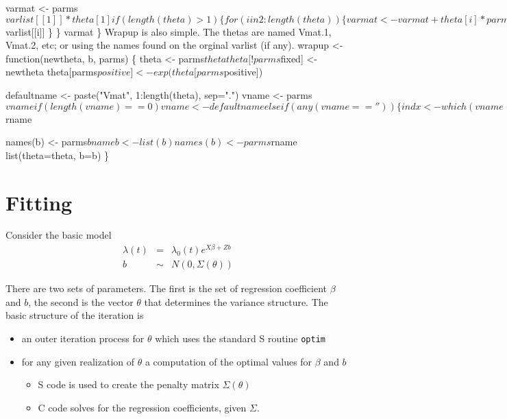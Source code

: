 \documentclass{article}
\begin{document}
     varmat <- parms$varlist[[1]] * theta[1]
     if (length(theta) >1) \{
         for (i in 2:length(theta)) \{
             varmat <- varmat + theta[i]*parms$varlist[[i]]
             \}
         \}
     varmat
     \}
\nwendcode{}\nwdocspar
Wrapup is also simple. The thetas are named Vmat.1, Vmat.2, etc; or using
the names found on the orginal varlist (if any).
\nwenddocs{}\endmoddef
wrapup <- function(newtheta, b, parms) \{
        theta <- parms$theta
        theta[!parms$fixed] <- newtheta
        theta[parms$positive] <- exp(theta[parms$positive])

        defaultname <- paste("Vmat", 1:length(theta), sep=".")
        vname <- parms$vname
        if (length(vname)==0) vname <- defaultname
        else if (any(vname==''))\{
            indx <- which(vname=='')
            vname[indx] <- defaultname[indx]
            \}
        names(theta) <- vname
        theta <- list(theta)
        names(theta) <- parms$rname
        
        names(b) <- parms$bname
        b <- list(b)
        names(b) <- parms$rname
        list(theta=theta, b=b)
        \}
\nwendcode{}\nwdocspar
\section{Fitting}
Consider the basic model
\begin{eqnarray*}
 \lambda(t) &=& \lambda_0(t) e^{X\beta + Zb} \\
 b &\sim& N(0, \Sigma(\theta))
\end{eqnarray*}

There are two sets of parameters.
The first is the set of regression coefficient $\beta$ and $b$,
the second is the vector $\theta$ that determines the variance
structure.
The basic structure of the iteration is
\begin{itemize}
\item an outer iteration process for $\theta$ which uses the standard
S routine {\tt{}optim}
\item for any given realization of $\theta$ a computation of the optimal
values for $\beta$ and $b$
\begin{itemize}
\item S code is used to create the penalty matrix $\Sigma(\theta)$
\item C code solves for the regression coefficients, given $\Sigma$.
\end{itemize}
\end{itemize}
\end{document}
